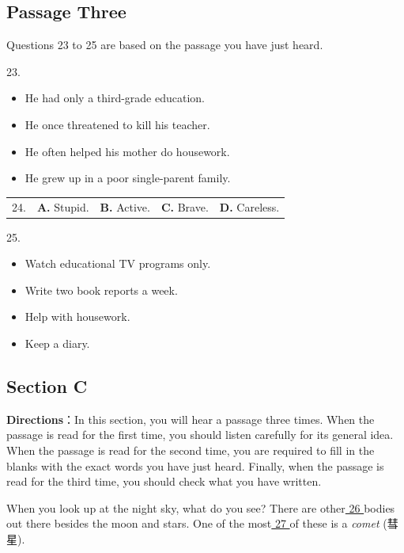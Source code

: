 \documentclass[UTF8,11pt]{ctexart}
\begin{document}
\subsection*{Passage Three}


Questions 23 to 25 are based on the passage you have just heard.


23.


\begin{itemize}[leftmargin=2em,itemsep=.2em,topsep=.4em]\item[A.] He had only a third-grade education.
\item[B.] He once threatened to kill his teacher.
\item[C.] He often helped his mother do housework.
\item[D.] He grew up in a poor single-parent family.
\end{itemize}

\noindent\begin{tabularx}{\linewidth}{@{}lXXXX@{}}24. & \textbf{A.} Stupid. & \textbf{B.} Active. & \textbf{C.} Brave. & \textbf{D.} Careless.\\\end{tabularx}\par

25.


\begin{itemize}[leftmargin=2em,itemsep=.2em,topsep=.4em]\item[A.] Watch educational TV programs only.
\item[B.] Write two book reports a week.
\item[C.] Help with housework.
\item[D.] Keep a diary.
\end{itemize}

\subsection*{\textbf{Section C}}


\textbf{Directions}：In this section, you will hear a passage three times. When the passage is read for the first time, you should listen carefully for its general idea. When the passage is read for the second time, you are required to fill in the blanks with the exact words you have just heard. Finally, when the passage is read for the third time, you should check what you have written.


When you look up at the night sky, what do you see? There are other\uline{ 26 }bodies out there besides the moon and stars. One of the most\uline{ 27 }of these is a\textit{ comet} (彗星).
\end{document}
